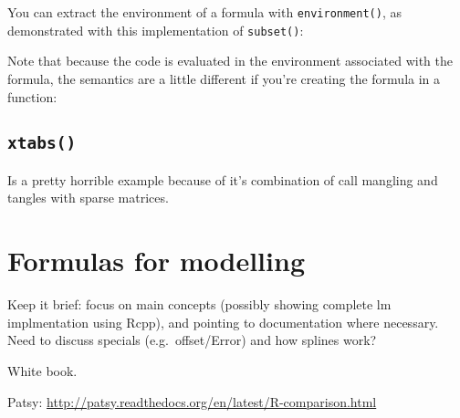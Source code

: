 You can extract the environment of a formula with
\texttt{environment()}, as demonstrated with this implementation of
\texttt{subset()}:

\begin{Shaded}
\begin{Highlighting}[]
\StringTok{ }
  \NormalTok{(}\NormalTok{), }\StringTok{ }\NormalTok{)}
  \StringTok{ }\NormalTok{(f[[}\NormalTok{]], x, }
\NormalTok{\}}
\StringTok{ }\StringTok{ }\NormalTok{)}
\end{Highlighting}
\end{Shaded}

Note that because the code is evaluated in the environment associated
with the formula, the semantics are a little different if you're
creating the formula in a function:

\begin{Shaded}
\begin{Highlighting}[]
\StringTok{ }\StringTok{ }\StringTok{ }
\NormalTok{(}\NormalTok{))}
\end{Highlighting}
\end{Shaded}

\subsection{\texttt{xtabs()}}

Is a pretty horrible example because of it's combination of call
mangling and tangles with sparse matrices.

\section{Formulas for modelling}

Keep it brief: focus on main concepts (possibly showing complete lm
implmentation using Rcpp), and pointing to documentation where
necessary. Need to discuss specials (e.g.~offset/Error) and how splines
work?

White book.

Patsy: \url{http://patsy.readthedocs.org/en/latest/R-comparison.html}

